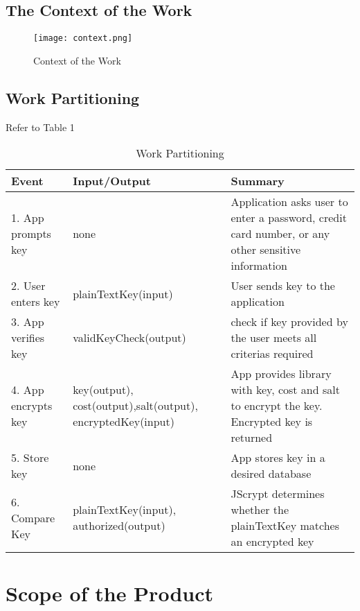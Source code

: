 \documentclass[12pt]{article}
\begin{document}
\subsection{The Context of the Work}

  \begin{figure}[H]
  \centerline{\texttt{[image: context.png]}}
  \caption{Context of the Work}
  \end{figure}


\subsection{Work Partitioning}
  Refer to Table 1
  \begin{table}[H]

      \caption{Work Partitioning}
      \label{tab:table2}

      \begin{tabular}{ | p{4cm} | p{4cm} | p{7cm}| }
        \hline
            Event & Input/Output & Summary \\
        \hline

          1. App prompts key & none & Application asks user to enter a password, credit card number, or any other sensitive information \\
       \hline

        2. User enters key & plainTextKey(input) & User sends key to the application \\
       \hline

        3. App verifies key & validKeyCheck(output) & check if key provided by the user meets all criterias required \\

       \hline

        4. App encrypts key & key(output), cost(output),salt(output), encryptedKey(input) & App provides library with key, cost and salt to encrypt the key. Encrypted key is returned \\
       \hline
        5. Store key & none & App stores key in a desired database \\
       \hline
        6. Compare Key & plainTextKey(input), authorized(output) & JScrypt determines whether the plainTextKey matches an encrypted key \\
       \hline
      \end{tabular}
     
  \end{table}

\section{Scope of the Product}
\end{document}
